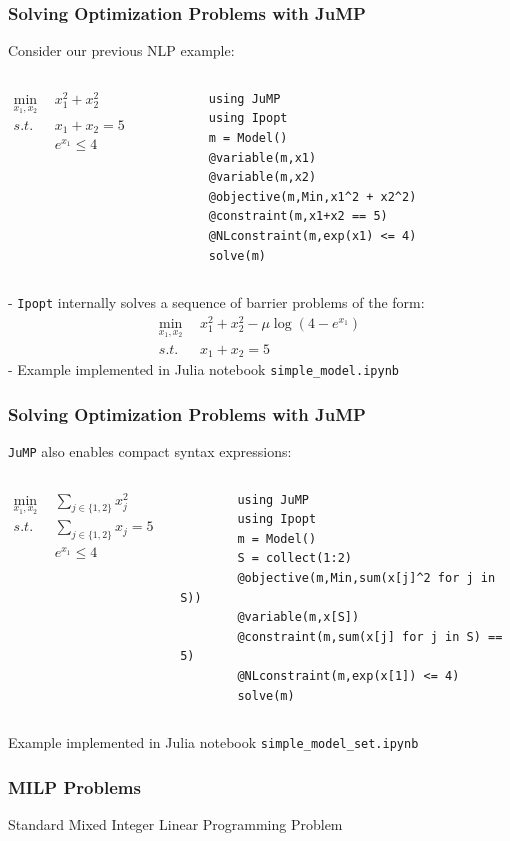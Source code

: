 \begin{frame}[fragile,t]
  \frametitle{Solving Optimization Problems with JuMP}
  Consider our previous NLP example:
  \begin{columns}
      \begin{align*}
          \min_{x_1,x_2} \ \ &x_1^2 + x_2^2\\
          s.t. \ \ &x_1 + x_2 = 5\\
          &e^{x_1} \le 4\\
      \end{align*}
      \lstset{ basicstyle = \scriptsize}
      \begin{lstlisting}
        using JuMP
        using Ipopt
        m = Model()
        @variable(m,x1)
        @variable(m,x2)
        @objective(m,Min,x1^2 + x2^2)
        @constraint(m,x1+x2 == 5)
        @NLconstraint(m,exp(x1) <= 4)
        solve(m)
      \end{lstlisting}
    \vspace{0.0cm}
  \end{columns}
 - {\tt Ipopt} internally solves a sequence of barrier problems of the form:
        \begin{align*}
          \min_{x_1,x_2} \ \ &x_1^2 + x_2^2-\mu \log (4-e^{x_1})\\
          s.t. \ \ &x_1 + x_2 = 5
      \end{align*}
- Example implemented in Julia notebook {\footnotesize {\tt simple_model.ipynb}}
\end{frame}

\begin{frame}[fragile,t]
  \frametitle{Solving Optimization Problems with JuMP}
  {\tt JuMP} also enables compact syntax expressions:
  \begin{columns}
      \begin{align*}
          \min_{x_1,x_2} \ \ &\sum_{j\in \{1,2\}}x_j^2\\
          s.t. \ \ &\sum_{j\in \{1,2\}}x_j= 5\\
          &e^{x_1} \le 4\\
      \end{align*}
      \lstset{ basicstyle = \scriptsize}
      \begin{lstlisting}
        using JuMP
        using Ipopt
        m = Model()
        S = collect(1:2)
        @objective(m,Min,sum(x[j]^2 for j in S))
        @variable(m,x[S])
        @constraint(m,sum(x[j] for j in S) == 5)
        @NLconstraint(m,exp(x[1]) <= 4)
        solve(m)
      \end{lstlisting}
    \vspace{0.5cm}
  \end{columns}
 Example implemented in Julia notebook {\footnotesize{\tt simple_model_set.ipynb}}
\end{frame}

\begin{frame}
    \frametitle{MILP Problems}
    \begin{block}{Standard Mixed Integer Linear Programming Problem}
    \end{block}

\end{frame}
